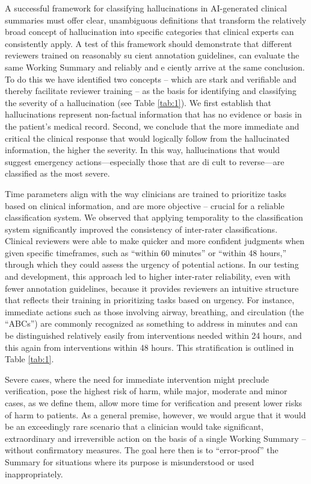 \documentclass{style/myclass}
\begin{document}
A successful framework for classifying hallucinations in AI-generated clinical summaries must offer clear, unambiguous definitions that transform the relatively broad concept of hallucination into specific categories that clinical experts can consistently apply. A test of this framework should demonstrate that different reviewers trained on reasonably su cient annotation guidelines, can evaluate the same Working Summary and reliably and e ciently arrive at the same conclusion. To do this we have identified two concepts – which are stark and verifiable and thereby facilitate reviewer training – as the basis for identifying and classifying the severity of a hallucination (see Table \ref{tab:1}). We first establish that hallucinations represent non-factual information that has no evidence or basis in the patient’s medical record. Second, we conclude that the more immediate and critical the clinical response that would logically follow from the hallucinated information, the higher the severity. In this way, hallucinations that would suggest emergency actions—especially those that are di cult to reverse—are classified as the most severe.

Time parameters align with the way clinicians are trained to prioritize tasks based on clinical information, and are more objective – crucial for a reliable classification system. We observed that applying temporality to the classification system significantly improved the consistency of inter-rater classifications. Clinical reviewers were able to make quicker and more confident judgments when given specific timeframes, such as “within 60 minutes” or “within 48 hours,” through which they could assess the urgency of potential actions. In our testing and development, this approach led to higher inter-rater reliability, even with fewer annotation guidelines, because it provides reviewers an intuitive structure that reflects their training in prioritizing tasks based on urgency. For instance, immediate actions such as those involving airway, breathing, and circulation (the “ABCs”) are commonly recognized as something to address in minutes and can be distinguished relatively easily from interventions needed within 24 hours, and this again from interventions within 48 hours. This stratification is outlined in Table \ref{tab:1}.

Severe cases, where the need for immediate intervention might preclude verification, pose the highest risk of harm, while major, moderate and minor cases, as we define them, allow more time for verification and present lower risks of harm to patients. As a general premise, however, we would argue that it would be an exceedingly rare scenario that a clinician would take significant, extraordinary and irreversible action on the basis of a single Working Summary – without confirmatory measures. The goal here then is to “error-proof” the Summary for situations where its purpose is misunderstood or used inappropriately.
\end{document}
